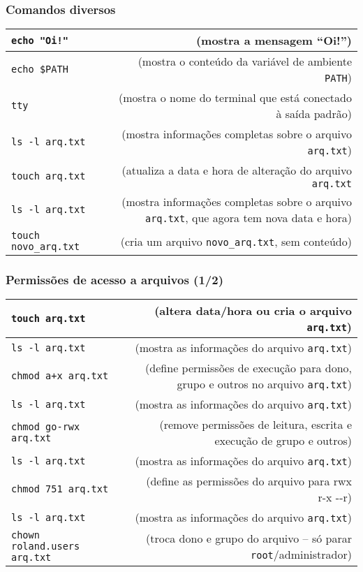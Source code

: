 \documentclass[aspectratio=169]{beamer}
\begin{document}
\begin{frame}\frametitle{Comandos diversos}
\begin{tabular}{lp{0.5cm}r}
\texttt{echo "Oi!"} & & \tiny{(mostra a mensagem ``Oi!'')}\\\hline
\texttt{echo \$PATH} & & \tiny{(mostra o conteúdo da variável de ambiente \texttt{PATH})}\\\hline
\texttt{tty} & & \tiny{(mostra o nome do terminal que está conectado à saída padrão)}\\\hline
\texttt{ls -l arq.txt} & & \tiny{(mostra informações completas sobre o arquivo \texttt{arq.txt})}\\\hline
\texttt{touch arq.txt} & & \tiny{(atualiza a data e hora de alteração do arquivo \texttt{arq.txt}}\\\hline
\texttt{ls -l arq.txt} & & \tiny{(mostra informações completas sobre o arquivo \texttt{arq.txt}, que agora tem nova data e hora)}\\\hline
\texttt{touch novo\_arq.txt} & & \tiny{(cria um arquivo \texttt{novo\_arq.txt}, sem conteúdo)}\\\hline
\end{tabular}
\end{frame}

\begin{frame}\frametitle{Permissões de acesso a arquivos (1/2)}
\begin{tabular}{lp{0.1cm}r}
\texttt{touch arq.txt} & & \tiny{(altera data/hora ou cria o arquivo \texttt{arq.txt})}\\\hline
\texttt{ls -l arq.txt} & & \tiny{(mostra as informações do arquivo \texttt{arq.txt})}\\\hline
\texttt{chmod a+x arq.txt} & & \tiny{(define permissões de execução para dono, grupo e outros no arquivo \texttt{arq.txt})}\\\hline
\texttt{ls -l arq.txt} & & \tiny{(mostra as informações do arquivo \texttt{arq.txt})}\\\hline
\texttt{chmod go-rwx arq.txt} & & \tiny{(remove permissões de leitura, escrita e execução de grupo e outros)}\\\hline
\texttt{ls -l arq.txt} & & \tiny{(mostra as informações do arquivo \texttt{arq.txt})}\\\hline
\texttt{chmod 751 arq.txt} & & \tiny{(define as permissões do arquivo para rwx r-x -{}-r)}\\\hline
\texttt{ls -l arq.txt} & & \tiny{(mostra as informações do arquivo \texttt{arq.txt})}\\\hline
\texttt{chown roland.users arq.txt} & & \tiny{(troca dono e grupo do arquivo -- só parar \texttt{root}/administrador)}\\
\end{tabular}
\end{frame}
\end{document}
